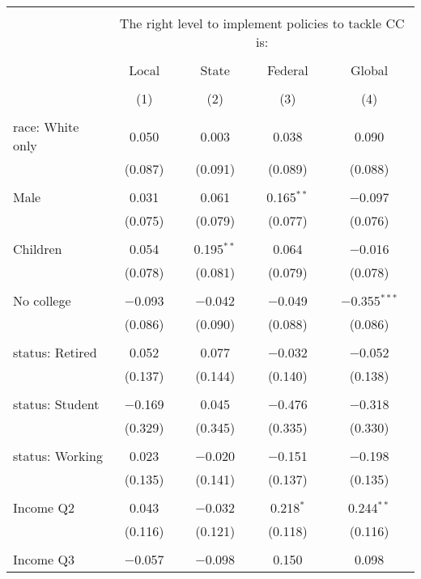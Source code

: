 
\begin{tabular}{@{\extracolsep{5pt}}lcccc} 
\\[-1.8ex]\hline 
\hline \\[-1.8ex] 
 & \multicolumn{4}{c}{The right level to implement policies to tackle CC is:} \\ 
\cline{2-5} 
\\[-1.8ex] & Local & State & Federal & Global \\ 
\\[-1.8ex] & (1) & (2) & (3) & (4)\\ 
\hline \\[-1.8ex] 
 race: White only & 0.050 & 0.003 & 0.038 & 0.090 \\ 
  & (0.087) & (0.091) & (0.089) & (0.088) \\ 
  & & & & \\ 
 Male & 0.031 & 0.061 & 0.165$^{**}$ & $-$0.097 \\ 
  & (0.075) & (0.079) & (0.077) & (0.076) \\ 
  & & & & \\ 
 Children & 0.054 & 0.195$^{**}$ & 0.064 & $-$0.016 \\ 
  & (0.078) & (0.081) & (0.079) & (0.078) \\ 
  & & & & \\ 
 No college & $-$0.093 & $-$0.042 & $-$0.049 & $-$0.355$^{***}$ \\ 
  & (0.086) & (0.090) & (0.088) & (0.086) \\ 
  & & & & \\ 
 status: Retired & 0.052 & 0.077 & $-$0.032 & $-$0.052 \\ 
  & (0.137) & (0.144) & (0.140) & (0.138) \\ 
  & & & & \\ 
 status: Student & $-$0.169 & 0.045 & $-$0.476 & $-$0.318 \\ 
  & (0.329) & (0.345) & (0.335) & (0.330) \\ 
  & & & & \\ 
 status: Working & 0.023 & $-$0.020 & $-$0.151 & $-$0.198 \\ 
  & (0.135) & (0.141) & (0.137) & (0.135) \\ 
  & & & & \\ 
 Income Q2 & 0.043 & $-$0.032 & 0.218$^{*}$ & 0.244$^{**}$ \\ 
  & (0.116) & (0.121) & (0.118) & (0.116) \\ 
  & & & & \\ 
 Income Q3 & $-$0.057 & $-$0.098 & 0.150 & 0.098 \\ 

\end{tabular}
